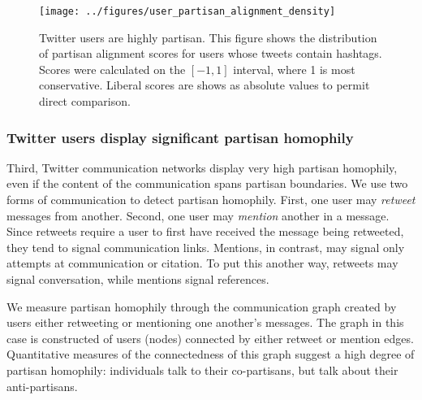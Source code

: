 \documentclass{article}
\begin{document}
\begin{figure}[ht]
  \centering
  \texttt{[image: ../figures/user\_partisan\_alignment\_density]}
  \caption{Twitter users are highly partisan. This figure shows the distribution of partisan alignment
    scores for users whose tweets contain hashtags. Scores were
    calculated on the $[-1 , 1]$ interval, where 1 is most
    conservative. Liberal scores are shows as absolute values to permit direct comparison.}
  \label{fig:user-pscore-distribution}
\end{figure}




\subsubsection{Twitter users display significant partisan homophily}
\label{sec:twitt-users-displ}

Third, Twitter communication networks display very high partisan
homophily, even if the content of the communication spans partisan
boundaries. We use two forms of communication to detect partisan
homophily. First, one user may \textit{retweet} messages from
another. Second, one user may \textit{mention} another in a
message. Since retweets require a user to first have received the
message being retweeted, they tend to signal communication
links. Mentions, in contrast, may signal only attempts at
communication or citation. To put this another way, retweets may
signal conversation, while mentions signal references.

We measure partisan homophily through the communication graph created
by users either retweeting or mentioning one another's messages. The
graph in this case is constructed of users (nodes) connected by either
retweet or mention edges. Quantitative measures of the connectedness
of this graph suggest a high degree of partisan homophily: individuals
talk to their co-partisans, but talk about their anti-partisans.
\end{document}
